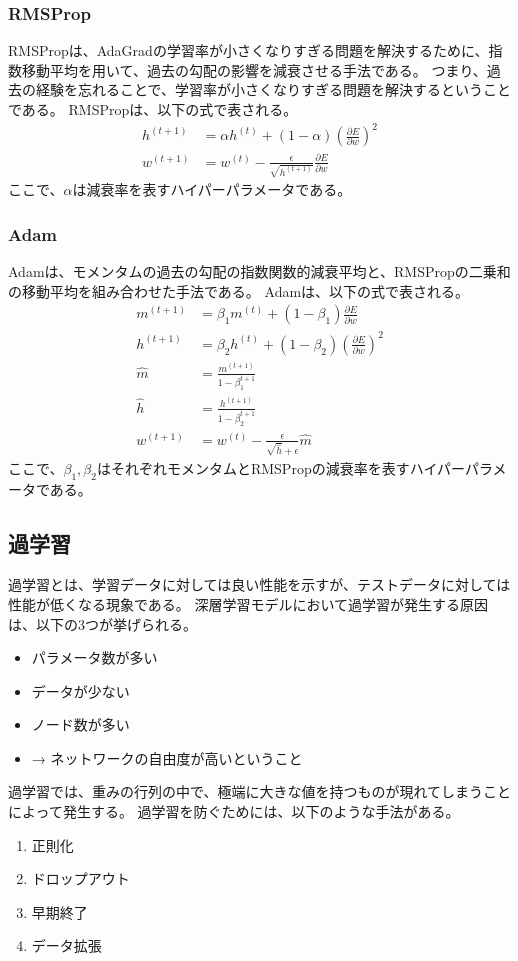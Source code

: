 \documentclass{ltjsarticle}
\begin{document}
\subsubsection{RMSProp}
RMSPropは、AdaGradの学習率が小さくなりすぎる問題を解決するために、指数移動平均を用いて、過去の勾配の影響を減衰させる手法である。
つまり、過去の経験を忘れることで、学習率が小さくなりすぎる問題を解決するということである。
RMSPropは、以下の式で表される。
\begin{align}
  h^{(t+1)} &= \alpha h^{(t)} + (1 - \alpha) \left( \frac{\partial E}{\partial w} \right)^2 \\
  w^{(t+1)} &= w^{(t)} - \frac{\epsilon}{\sqrt{h^{(t+1)}}} \frac{\partial E}{\partial w}
\end{align}
ここで、$\alpha$は減衰率を表すハイパーパラメータである。


\subsubsection{Adam}
Adamは、モメンタムの過去の勾配の指数関数的減衰平均と、RMSPropの二乗和の移動平均を組み合わせた手法である。
Adamは、以下の式で表される。
\begin{align}
  m^{(t+1)} &= \beta_1 m^{(t)} + (1 - \beta_1) \frac{\partial E}{\partial w} \\
  h^{(t+1)} &= \beta_2 h^{(t)} + (1 - \beta_2) \left( \frac{\partial E}{\partial w} \right)^2 \\
  \hat{m} &= \frac{m^{(t+1)}}{1 - \beta_1^{t+1}} \\
  \hat{h} &= \frac{h^{(t+1)}}{1 - \beta_2^{t+1}} \\
  w^{(t+1)} &= w^{(t)} - \frac{\epsilon}{\sqrt{\hat{h}} + \epsilon} \hat{m}
\end{align}
ここで、$\beta_1, \beta_2$はそれぞれモメンタムとRMSPropの減衰率を表すハイパーパラメータである。


\subsection{過学習}
過学習とは、学習データに対しては良い性能を示すが、テストデータに対しては性能が低くなる現象である。
深層学習モデルにおいて過学習が発生する原因は、以下の3つが挙げられる。
\begin{itemize}
  \item パラメータ数が多い
  \item データが少ない
  \item ノード数が多い
  \item → ネットワークの自由度が高いということ
\end{itemize}
過学習では、重みの行列の中で、極端に大きな値を持つものが現れてしまうことによって発生する。
過学習を防ぐためには、以下のような手法がある。
\begin{enumerate}
  \item 正則化
  \item ドロップアウト
  \item 早期終了
  \item データ拡張
\end{enumerate}
\end{document}
